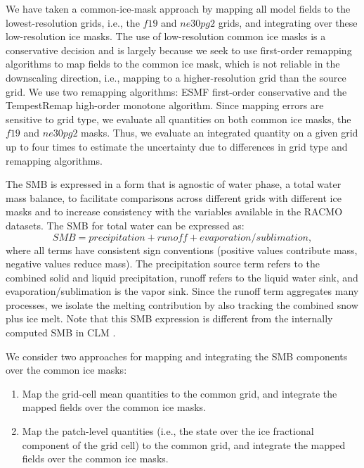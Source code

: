 \documentclass[draft]{agujournal2019}
\begin{document}
We have taken a common-ice-mask approach by mapping all model fields to the lowest-resolution grids, i.e., the $f19$ and $ne30pg2$ grids, and integrating over these low-resolution ice masks. The use of low-resolution common ice masks is a conservative decision and is largely because we seek to use first-order remapping algorithms to map fields to the common ice mask, which is not reliable in the downscaling direction, i.e., mapping to a higher-resolution grid than the source grid. We use two remapping algorithms: ESMF first-order conservative and the TempestRemap \cite{TempestRemap} high-order monotone algorithm. Since mapping errors are sensitive to grid type, we evaluate all quantities on both common ice masks, the $f19$ and $ne30pg2$ masks. Thus, we evaluate an integrated quantity on a given grid up to four times to estimate the uncertainty due to differences in grid type and remapping algorithms.

The SMB is expressed in a form that is agnostic of water phase, a total water mass balance, to facilitate comparisons across different grids with different ice masks and to increase consistency with the variables available in the RACMO datasets. The SMB for total water can be expressed as:
\begin{equation}
SMB = precipitation + runoff + evaporation/sublimation, \label{eq:SMB}
\end{equation}
where all terms have consistent sign conventions (positive values contribute mass, negative values reduce mass). The precipitation source term refers to the combined solid and liquid precipitation, runoff refers to the liquid water sink, and evaporation/sublimation is the vapor sink. Since the runoff term aggregates many processes, we isolate the melting contribution by also tracking the combined snow plus ice melt. Note that this SMB expression is different from the internally computed SMB in CLM \cite{KETAL2020JAMES}.

We consider two approaches for mapping and integrating the SMB components over the common ice masks:
\begin{enumerate}
\item Map the grid-cell mean quantities to the common grid, and integrate the mapped fields over the common ice masks. \label{lbl:label1}
\item Map the patch-level quantities (i.e., the state over the ice fractional component of the grid cell) to the common grid, and integrate the mapped fields over the common ice masks. \label{lbl:label2}
\end{enumerate}
\end{document}
